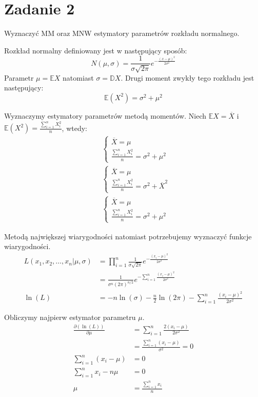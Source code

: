 \documentclass{article}
\begin{document}
\section{Zadanie 2}
Wyznaczyć MM oraz MNW estymatory parametrów rozkładu normalnego. \\ \par

Rozkład normalny definiowany jest w następujący sposób:
\[ N(\mu,\sigma)  = \frac{1}{\sigma\sqrt{2\pi}}e^{-\frac{(x-\mu)^2}{2\sigma^2}} \]
Parametr $\mu = \mathbb{E}X$ natomiast $\sigma = \mathbb{D}X$. Drugi moment zwykły tego rozkładu jest następujący:
\[ \mathbb{E}(X^2) = \sigma^2 + \mu^2 \]

Wyznaczymy estymatory parametrów metodą momentów. Niech $ \mathbb{E}X = \overline{X} $ i $\mathbb{E}(X^2) = \frac{\sum_{i=1}^n X_i^2}{n}$, wtedy:
\begin{align*}
& \left\{ 
\begin{array}{l}  \overline{X} = \mu \\  \frac{\sum_{i=1}^n X_i^2}{n} = \sigma^2 + \mu^2 \end{array} \right. \\
& \left\{ 
\begin{array}{l}  \overline{X} = \mu \\  \frac{\sum_{i=1}^n X_i^2}{n} = \sigma^2 + \overline{X}^2 \end{array} \right. \\
& \left\{ 
\begin{array}{l}  \overline{X} = \mu \\  \frac{\sum_{i=1}^n X_i^2}{n} = \sigma^2 + \mu^2 \end{array} \right. 
\end{align*}

Metodą największej wiarygodności natomiast potrzebujemy wyznaczyć funkcje wiarygodności.
\begin{align*}
L(x_1,x_2,\dots,x_n|\mu,\sigma) & = \prod_{i=1}^n \frac{1}{\sigma\sqrt{2\pi}}e^{-\frac{(x_i-\mu)^2}{2\sigma^2}} \\
& = \frac{1}{\sigma^n(2\pi)^{n/2}} e^{-\sum_{i=1}^n \frac{(x_i-\mu)^2}{2\sigma^2}} \\
\ln(L) & = -n\ln(\sigma) - \frac{n}{2}\ln(2\pi) - \sum_{i=1}^n \frac{(x_i-\mu)^2}{2\sigma^2}
\end{align*}

Obliczymy najpierw estymator parametru $\mu$.
\begin{align*}
\frac{\partial(\ln(L))}{\partial\mu} & = \sum_{i=1}^n \frac{2(x_i-\mu)}{2\sigma^2} \\
& = \frac{\sum_{i=1}^n (x_i-\mu)}{\sigma^2} = 0 \\
\sum_{i=1}^n (x_i-\mu) & = 0 \\
\sum_{i=1}^n x_i - n\mu & = 0 \\
\mu & = \frac{\sum_{i=1}^n x_i}{n}
\end{align*}
\end{document}
